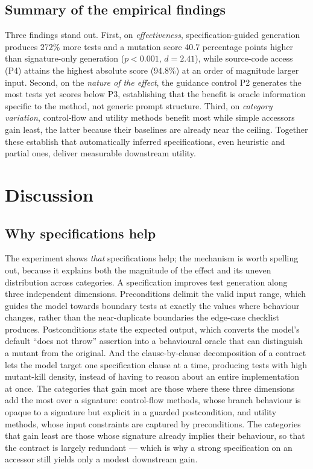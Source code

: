 \subsection{Summary of the empirical findings}
\label{sec:art1:summary}

Three findings stand out. First, on \emph{effectiveness}, specification-guided
generation produces 272\% more tests and a mutation score 40.7 percentage points
higher than signature-only generation ($p < 0.001$, $d = 2.41$), while source-code
access (P4) attains the highest absolute score (94.8\%) at an order of magnitude
larger input. Second, on the \emph{nature of the effect}, the guidance control P2
generates the most tests yet scores below P3, establishing that the benefit is
oracle information specific to the method, not generic prompt structure. Third, on
\emph{category variation}, control-flow and utility methods benefit most while
simple accessors gain least, the latter because their baselines are already near
the ceiling. Together these establish that automatically inferred specifications,
even heuristic and partial ones, deliver measurable downstream utility.

\section{Discussion}
\label{sec:art1:discussion}

\subsection{Why specifications help}
\label{sec:art1:why-help}

The experiment shows \emph{that} specifications help; the mechanism is worth
spelling out, because it explains both the magnitude of the effect and its uneven
distribution across categories. A specification improves test generation along
three independent dimensions. Preconditions delimit the valid input range, which
guides the model towards boundary tests at exactly the values where behaviour
changes, rather than the near-duplicate boundaries the edge-case checklist
produces. Postconditions state the expected output, which converts the model's
default \enquote{does not throw} assertion into a behavioural oracle that can
distinguish a mutant from the original. And the clause-by-clause decomposition of a
contract lets the model target one specification clause at a time, producing tests
with high mutant-kill density, instead of having to reason about an entire
implementation at once. The categories that gain most are those where these three
dimensions add the most over a signature: control-flow methods, whose branch
behaviour is opaque to a signature but explicit in a guarded postcondition, and
utility methods, whose input constraints are captured by preconditions. The
categories that gain least are those whose signature already implies their
behaviour, so that the contract is largely redundant --- which is why a strong
specification on an accessor still yields only a modest downstream gain.

